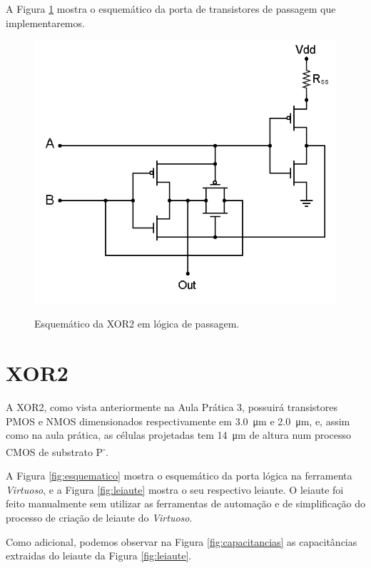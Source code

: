 \documentclass{iiufrgs}
\newcommand{\virtuoso}{\textit{Virtuoso}}
\begin{document}
A Figura \ref{fig:xor} mostra o esquemático da porta de transistores de passagem que implementaremos.

\begin{figure}[htbp]
    \centering
    \caption{Esquemático da XOR2 em lógica de passagem.}
    \includegraphics[scale=0.6]{images/xor_schem.png}
    \label{fig:xor}
\end{figure}

\section{XOR2}\label{nand}
A XOR2, como vista anteriormente na Aula Prática 3, possuirá transistores PMOS e NMOS dimensionados respectivamente em \SI{3.0}{\um} e \SI{2.0}{\um}, e, assim como na aula prática, as células projetadas tem \SI{14}{\um} de altura num processo CMOS de substrato P\textsuperscript{-}.

A Figura \ref{fig:esquematico} mostra o esquemático da porta lógica na ferramenta \virtuoso, e a Figura \ref{fig:leiaute} mostra o seu respectivo leiaute. O leiaute foi feito manualmente sem utilizar as ferramentas de automação e de simplificação do processo de criação de leiaute do \virtuoso.

Como adicional, podemos observar na Figura \ref{fig:capacitancias} as capacitâncias extraidas do leiaute da Figura \ref{fig:leiaute}.
\end{document}
